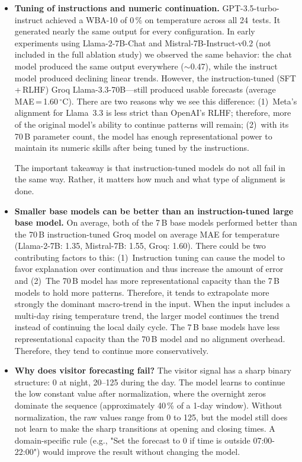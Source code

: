 \documentclass[11pt,a4paper]{article}
\begin{document}
\begin{itemize}[leftmargin=*]

\item \textbf{Tuning of instructions and numeric continuation.}
GPT-3.5-turbo-instruct achieved a WBA-10 of 0\,\% on temperature across all 24~tests.
It generated nearly the same output for every configuration.
In early experiments using Llama-2-7B-Chat and Mistral-7B-Instruct-v0.2 (not included in the full ablation study) we observed the same behavior: the chat model produced the same output everywhere ($\sim$0.47), while the instruct model produced declining linear trends.
However, the instruction-tuned (SFT\,+\,RLHF) Groq Llama-3.3-70B---still produced usable forecasts (average MAE\,=\,1.60\,$^{\circ}$C).
There are two reasons why we see this difference: (1)~Meta’s alignment for Llama~3.3 is less strict than OpenAI’s RLHF; therefore, more of the original model’s ability to continue patterns will remain; (2)~with its 70\,B parameter count, the model has enough representational power to maintain its numeric skills after being tuned by the instructions.

The important takeaway is that instruction-tuned models do not all fail in the same way. Rather, it matters how much and what type of alignment is done.

\item \textbf{Smaller base models can be better than an instruction-tuned large base model.}
On average, both of the 7\,B base models performed better than the 70\,B instruction-tuned Groq model on average MAE for temperature (Llama-2-7B: 1.35, Mistral-7B: 1.55, Groq: 1.60).
There could be two contributing factors to this: (1)~Instruction tuning can cause the model to favor explanation over continuation and thus increase the amount of error and (2)~The 70\,B model has more representational capacity than the 7\,B models to hold more patterns. Therefore, it tends to extrapolate more strongly the dominant macro-trend in the input.
When the input includes a multi-day rising temperature trend, the larger model continues the trend instead of continuing the local daily cycle.
The 7\,B base models have less representational capacity than the 70\,B model and no alignment overhead. Therefore, they tend to continue more conservatively.

\item \textbf{Why does visitor forecasting fail?}
The visitor signal has a sharp binary structure: 0 at night, 20--125 during the day.
The model learns to continue the low constant value after normalization, where the overnight zeros dominate the sequence (approximately 40\,\% of a 1-day window).
Without normalization, the raw values range from 0 to 125, but the model still does not learn to make the sharp transitions at opening and closing times.
A domain-specific rule (e.g., "Set the forecast to 0 if time is outside 07:00-22:00") would improve the result without changing the model.


\end{itemize}
\end{document}
